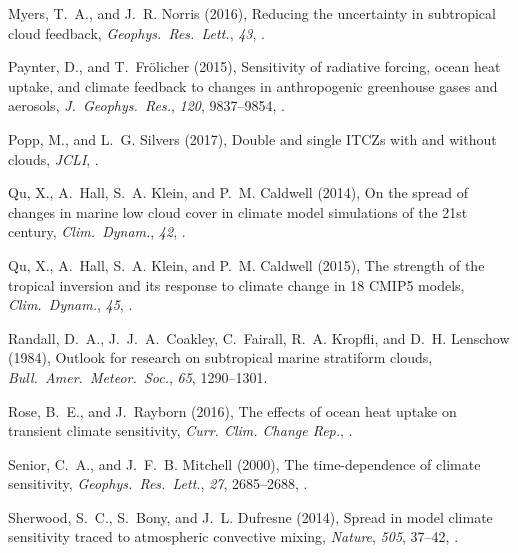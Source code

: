 \begin{thebibliography}{32}
Myers, T.~A., and J.~R. Norris (2016), Reducing the uncertainty in subtropical
  cloud feedback, \textit{Geophys.\ Res.\ Lett.}, \textit{43},
  .

Paynter, D., and T.~Fr\"{o}licher (2015), Sensitivity of radiative forcing,
  ocean heat uptake, and climate feedback to changes in anthropogenic
  greenhouse gases and aerosols, \textit{J.\ Geophys.\ Res.}, \textit{120},
  9837--9854, .

Popp, M., and L.~G. Silvers (2017), Double and single {ITCZ}s with and without
  clouds, \textit{JCLI}, .
  
Qu, X., A.~Hall, S.~A. Klein, and P.~M. Caldwell (2014), On the spread of
  changes in marine low cloud cover in climate model simulations of the 21st
  century, \textit{Clim.\ Dynam.}, \textit{42},
  .

Qu, X., A.~Hall, S.~A. Klein, and P.~M. Caldwell (2015), The strength of the
  tropical inversion and its response to climate change in 18 {CMIP5} models,
  \textit{Clim.\ Dynam.}, \textit{45}, .

Randall, D.~A., J.~J.~A.~Coakley, C.~Fairall, R.~A. Kropfli, and D.~H. Lenschow
  (1984), Outlook for research on subtropical marine stratiform clouds,
  \textit{Bull.\ Amer.\ Meteor.\ Soc.}, \textit{65}, 1290--1301.

Rose, B.~E., and J.~Rayborn (2016), The effects of ocean heat uptake on
  transient climate sensitivity, \textit{Curr. Clim. Change Rep.},
  .

Senior, C.~A., and J.~F.~B. Mitchell (2000), The time-dependence of climate
  sensitivity, \textit{Geophys.\ Res.\ Lett.}, \textit{27}, 2685--2688,
  .

Sherwood, S.~C., S.~Bony, and J.~L. Dufresne (2014), Spread in model climate
  sensitivity traced to atmospheric convective mixing, \textit{Nature},
  \textit{505}, 37--42, .


\end{thebibliography}
